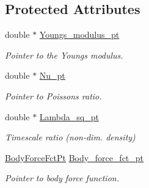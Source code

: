 \subsection*{Protected Attributes}
\begin{DoxyCompactItemize}
\item 
double $\ast$ \hyperlink{classoomph_1_1AxisymmetricLinearElasticityEquationsBase_a26867c1c3519bfc2910aaf0ec506dc0e}{Youngs\+\_\+modulus\+\_\+pt}
\begin{DoxyCompactList}\small\item\em Pointer to the Young\textquotesingle{}s modulus. \end{DoxyCompactList}\item 
double $\ast$ \hyperlink{classoomph_1_1AxisymmetricLinearElasticityEquationsBase_a8cfaabdb9413b153d83b27d3efd9a28c}{Nu\+\_\+pt}
\begin{DoxyCompactList}\small\item\em Pointer to Poisson\textquotesingle{}s ratio. \end{DoxyCompactList}\item 
double $\ast$ \hyperlink{classoomph_1_1AxisymmetricLinearElasticityEquationsBase_af4c300075ee05691d784682a7b02e2a6}{Lambda\+\_\+sq\+\_\+pt}
\begin{DoxyCompactList}\small\item\em Timescale ratio (non-\/dim. density) \end{DoxyCompactList}\item 
\hyperlink{classoomph_1_1AxisymmetricLinearElasticityEquationsBase_afa35b69a888eecae4b5f199a1adf88c5}{Body\+Force\+Fct\+Pt} \hyperlink{classoomph_1_1AxisymmetricLinearElasticityEquationsBase_adf2730220f65eb1fdd05715d1d1d9a78}{Body\+\_\+force\+\_\+fct\+\_\+pt}
\begin{DoxyCompactList}\small\item\em Pointer to body force function. \end{DoxyCompactList}\end{DoxyCompactItemize}
